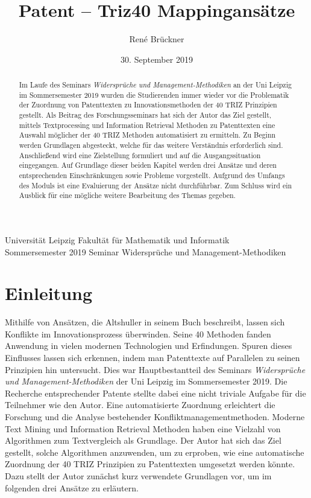 \documentclass[11pt,a4paper]{article}
\author{René Brückner}
\title{Patent -- Triz40 Mappingans\"atze}
\date{30. September 2019}
\begin{document}
\maketitle

\bigskip

\begin{abstract}
Im Laufe des Seminars \textit{Widersprüche und Management-Methodiken} an der
Uni Leipzig im Sommersemester 2019 wurden die Studierenden immer wieder vor
die Problematik der Zuordnung von Patenttexten zu Innovationsmethoden der 40
TRIZ Prinzipien gestellt.  Als Beitrag des Forschungsseminars hat sich der
Autor das Ziel gestellt, mittels Textprocessing und Information Retrieval
Methoden zu Patenttexten eine Auswahl möglicher der 40 TRIZ Methoden
automatisiert zu ermitteln.  Zu Beginn werden Grundlagen abgesteckt, welche
für das weitere Verständnis erforderlich sind.  Anschließend wird eine
Zielstellung formuliert und auf die Ausgangssituation eingegangen.  Auf
Grundlage dieser beiden Kapitel werden drei Ansätze und deren entsprechenden
Einschränkungen sowie Probleme vorgestellt.  Aufgrund des Umfangs des Moduls
ist eine Evaluierung der Ansätze nicht durchführbar.  Zum Schluss wird ein
Ausblick für eine mögliche weitere Bearbeitung des Themas gegeben.
\end{abstract}

\vfill

\noindent 
Universität Leipzig \hfill Fakultät für Mathematik und Informatik \\
Sommersemester 2019 \hfill Seminar Widersprüche und Management-Methodiken \\
\newpage

\tableofcontents
\newpage

\section{Einleitung}
Mithilfe von Ansätzen, die Altshuller in seinem Buch \cite{altshuller200240}
beschreibt, lassen sich Konflikte im Innovationsprozess überwinden.  Seine 40
Methoden fanden Anwendung in vielen modernen Technologien und Erfindungen.
Spuren dieses Einflusses lassen sich erkennen, indem man Patenttexte auf
Parallelen zu seinen Prinzipien hin untersucht.  Dies war Hauptbestantteil des
Seminars \textit{Widersprüche und Management-Methodiken} der Uni Leipzig im
Sommersemester 2019.  Die Recherche entsprechender Patente stellte dabei eine
nicht triviale Aufgabe für die Teilnehmer wie den Autor.  Eine automatisierte
Zuordnung erleichtert die Forschung und die Analyse bestehender
Konfliktmanagementmethoden.  Moderne Text Mining und Information Retrieval
Methoden haben eine Vielzahl von Algorithmen zum Textvergleich als Grundlage.
Der Autor hat sich das Ziel gestellt, solche Algorithmen anzuwenden, um zu
erproben, wie eine automatische Zuordnung der 40 TRIZ Prinzipien zu
Patenttexten umgesetzt werden könnte.  Dazu stellt der Autor zunächst kurz
verwendete Grundlagen vor, um im folgenden drei Ansätze zu erläutern.
\end{document}
